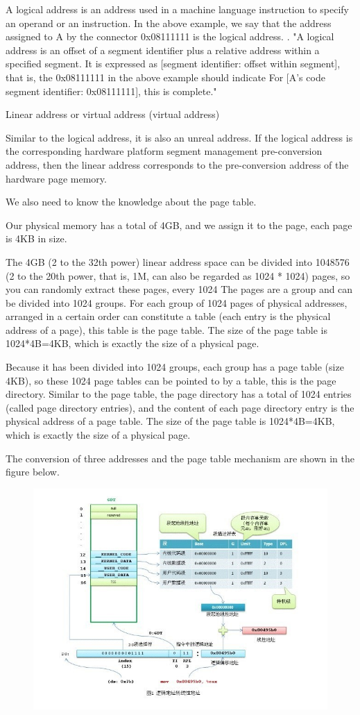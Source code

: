 A logical address is an address used in a machine language instruction to specify an operand or an instruction. In the above example, we say that the address assigned to A by the connector 0x08111111 is the logical address. . "A logical address is an offset of a segment identifier plus a relative address within a specified segment. It is expressed as [segment identifier: offset within segment], that is, the 0x08111111 in the above example should indicate For [A's code segment identifier: 0x08111111], this is complete."

{\large Linear address or virtual address (virtual address)}

Similar to the logical address, it is also an unreal address. If the logical address is the corresponding hardware platform segment management pre-conversion address, then the linear address corresponds to the pre-conversion address of the hardware page memory.

We also need to know the knowledge about the page table.

Our physical memory has a total of 4GB, and we assign it to the page, each page is 4KB in size.

The 4GB (2 to the 32th power) linear address space can be divided into 1048576 (2 to the 20th power, that is, 1M, can also be regarded as 1024 * 1024) pages, so you can randomly extract these pages, every 1024 The pages are a group and can be divided into 1024 groups. For each group of 1024 pages of physical addresses, arranged in a certain order can constitute a table (each entry is the physical address of a page), this table is the page table. The size of the page table is 1024*4B=4KB, which is exactly the size of a physical page.

Because it has been divided into 1024 groups, each group has a page table (size 4KB), so these 1024 page tables can be pointed to by a table, this is the page directory. Similar to the page table, the page directory has a total of 1024 entries (called page directory entries), and the content of each page directory entry is the physical address of a page table. The size of the page table is 1024*4B=4KB, which is exactly the size of a physical page.

The conversion of three addresses and the page table mechanism are shown in the figure below.
\begin{figure}[H]
\centering
\includegraphics[width=0.8\linewidth]{figure/address_transform_1}
\end{figure}


